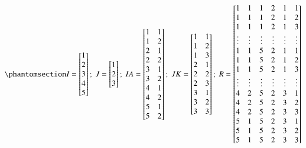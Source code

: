 \documentclass[
  authoryear,
  review,
  1p]{elsarticle}
\begin{document}
\begin{equation}\protect\phantomsection\label{eq-mat13}{
I = \begin{bmatrix}
1 \\
2 \\
3 \\
4 \\
5 
\end{bmatrix} ; \;
J = \begin{bmatrix}
1 \\
2 \\
3 
\end{bmatrix} ; \;
IA = \begin{bmatrix}
1 & 1 \\
1 & 2 \\
2 & 1 \\
2 & 2 \\
3 & 1 \\
3 & 2 \\
4 & 1 \\
4 & 2 \\
5 & 1 \\
5 & 2 
\end{bmatrix} ; \;
JK = \begin{bmatrix}
1 & 1 \\
1 & 2 \\
1 & 3 \\
2 & 1 \\
2 & 2 \\
2 & 3 \\
3 & 1 \\
3 & 2 \\
3 & 3 
\end{bmatrix} ; \;
R = \begin{bmatrix}
1 & 1 & 1 & 2 & 1 & 1 \\
1 & 1 & 1 & 2 & 1 & 2 \\
1 & 1 & 1 & 2 & 1 & 3 \\
\vdots & \vdots & \vdots & \vdots & \vdots & \vdots\\
1 & 1 & 5 & 2 & 1 & 1 \\
1 & 1 & 5 & 2 & 1 & 2 \\
1 & 1 & 5 & 2 & 1 & 3 \\
\vdots & \vdots & \vdots & \vdots & \vdots & \vdots\\
4 & 2 & 5 & 2 & 3 & 1 \\
4 & 2 & 5 & 2 & 3 & 2 \\
4 & 2 & 5 & 2 & 3 & 3 \\
5 & 1 & 5 & 2 & 3 & 1 \\
5 & 1 & 5 & 2 & 3 & 2 \\
5 & 1 & 5 & 2 & 3 & 3 
\end{bmatrix}
}\end{equation}
\end{document}
